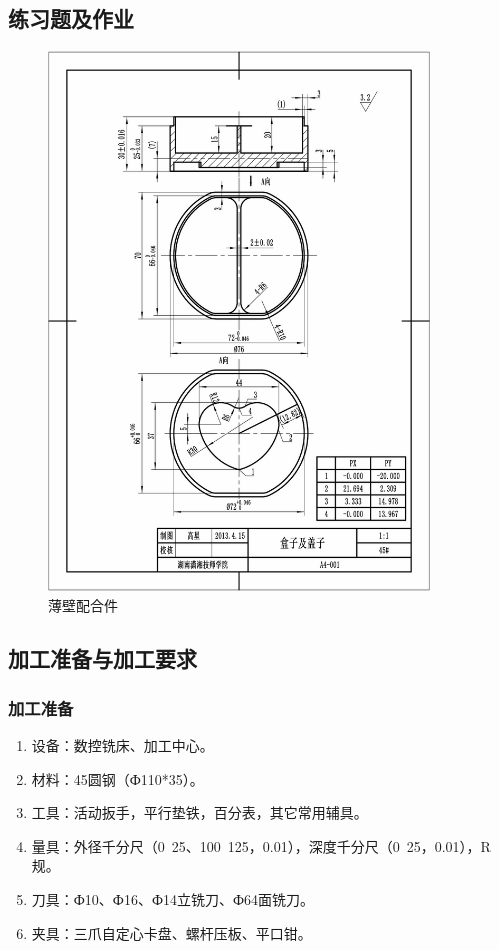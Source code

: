 \subsection{练习题及作业}
\begin{figure}[!hbtp]
	\centering	\includegraphics[width=0.9\textwidth]{images/shixi_4-1}
	\caption{薄壁配合件} \label{薄壁配合件}
\end{figure}

\vfill
\subsection{加工准备与加工要求}
\subsubsection{加工准备}
\begin{enumerate}[1、]
	\item 设备：数控铣床、加工中心。
	\item 材料：45圆钢（Ф110*35）。
	\item 工具：活动扳手，平行垫铁，百分表，其它常用辅具。
	\item 量具：外径千分尺（0~25、100~125，0.01），深度千分尺（0~25，0.01），R规。
	\item 刀具：Ф10、Ф16、Ф14立铣刀、Ф64面铣刀。
	\item 夹具：三爪自定心卡盘、螺杆压板、平口钳。
\end{enumerate}
